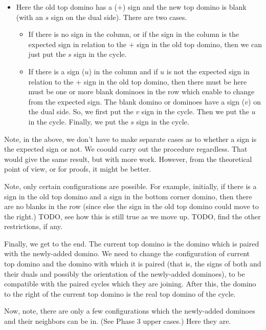\documentclass[12pt]{article}
\numberwithin{equation}{section}
\newcommand{\horizontalDominoRSShift}[4]{\filldraw [dominoRSStyle] (#2 - 1 + #4 + \eps, #1 - 1 + \eps) rectangle + (2 - \teps, 1 -\teps) node [dominoText] {$#3$};}
\newcommand{\verticalDominoRSShift}[4]{\filldraw [dominoRSStyle] (#2 - 1 + #4 + \eps,  #1 - 1 + \eps) rectangle + (1 - \teps,2 -\teps) node [dominoText] {$#3$};}
\begin{document}
\begin{itemize}
    \item Here the old top domino has a ($+$) sign and the new top domino is blank (with an $s$ sign on the dual side).
    There are two cases.
    \begin{itemize}
      \item If there is no sign in the column, or if the sign in the column is the expected sign in relation to the $+$ sign in the old top domino, then we can just put the $s$ sign in the cycle.
      \item If there is a sign ($u$) in the column and if $u$ is not the expected sign in relation to the $+$ sign in the old top domino, then there must be here must be one or more blank dominoes in the row which enable to change from the expected sign.
      The blank domino or dominoes have a sign ($v$) on the dual side.
      So, we first put the $v$ sign in the cycle.
      Then we put the $u$ in the cycle.
      Finally, we put the $s$ sign in the cycle.
    \end{itemize}
  \end{itemize}

  Note, in the above, we don't have to make separate cases as to whether a sign is the expected sign or not.
  We coould carry out the procedure regardless.
  That would give the same result, but with more work.
  However, from the theoretical point of view, or for proofs, it might be better.

  Note, only certain configurations are possible.
  For example, initially, if there is a sign in the old top domino and a sign in the bottom corner domino, then there are no blanks in the row (since else the sign in the old top domino could move to the right.)
  TODO, see how this is still true as we move up.
  TODO, find the other restrictions, if any.

  Finally, we get to the end.
  The current top domino is the domino which is paired with the newly-added domino.
  We need to change the configuration of current top domino and the domino with which it is paired (that is, the signs of both and their duals and possibly the orientation of the newly-added dominoes), to be compatible with the paired cycles which they are joining.
  After this, the domino to the right of the current top domino is the real top domino of the cycle.

  Now, note, there are only a few configurations which the newly-added dominoes and their neighbors can be in.  (See Phase 3 upper cases.)
  Here they are.
  \begin{figure}[H]
    \centering
  \end{figure}
\end{document}
